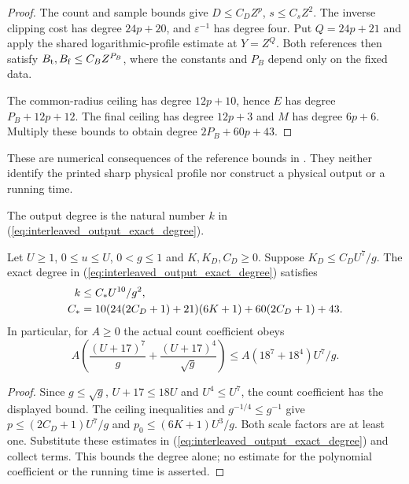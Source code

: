 \begin{proof}\leanok
    The count and sample bounds give $D\le C_DZ^p$, $s\le C_sZ^2$.
    The inverse clipping cost has degree $24p+20$, and
    $\varepsilon^{-1}$ has degree four. Put $Q=24p+21$ and apply the
    shared logarithmic-profile estimate at $Y=Z^Q$. Both references then
    satisfy $B_{\rm t},B_{\rm f}\le C_BZ^{P_B}$, where the constants and
    $P_B$ depend only on the fixed data.

    The common-radius ceiling has degree $12p+10$, hence $E$ has degree
    $P_B+12p+12$. The final ceiling has degree $12p+3$ and $M$ has degree
    $6p+6$. Multiply these bounds to obtain degree $2P_B+60p+43$.
\end{proof}

These are numerical consequences of the reference bounds in
\cite[lines 1797--1817]{Arad2016RigorousRG}. They neither identify the printed
sharp physical profile nor construct a physical output or a running time.


\begin{definition}
    \label{def:interleaved_output_degree}
    \leanok
    The output degree is the natural number $k$ in
    (\ref{eq:interleaved_output_exact_degree}).
\end{definition}

\begin{lemma}
    \label{lem:interleaved_output_degree_gap_bound}
    \leanok
    Let $U\ge1$, $0\le u\le U$, $0<g\le1$ and $K,K_D,C_D\ge0$.
    Suppose $K_D\le C_DU^7/g$. The exact degree in
    (\ref{eq:interleaved_output_exact_degree}) satisfies
    \begin{align}
        k   & \le C_*U^{10}/g^2,\notag                \\
        C_* & =10(24(2C_D+1)+21)(6K+1)+60(2C_D+1)+43.
        \label{eq:interleaved_output_degree_gap_bound}
    \end{align}
    In particular, for $A\ge0$ the actual count coefficient obeys
    \[
        A\left(\frac{(U+17)^7}{g}+\frac{(U+17)^4}{\sqrt g}\right)
        \le A(18^7+18^4)U^7/g.
    \]
\end{lemma}
\begin{proof}\leanok
    Since $g\le\sqrt g$, $U+17\le18U$ and $U^4\le U^7$, the count
    coefficient has the displayed bound. The ceiling inequalities and
    $g^{-1/4}\le g^{-1}$ give
    $p\le(2C_D+1)U^7/g$ and $p_0\le(6K+1)U^3/g$.
    Both scale factors are at least one. Substitute these estimates in
    (\ref{eq:interleaved_output_exact_degree}) and collect terms.
    This bounds the degree alone; no estimate for the polynomial
    coefficient or the running time is asserted.
\end{proof}


